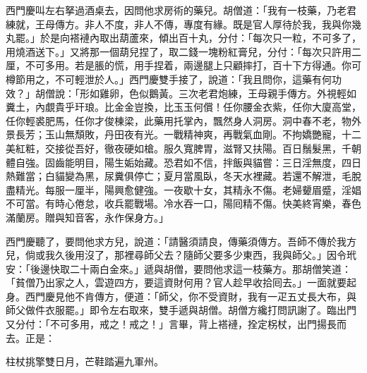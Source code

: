 西門慶叫左右拏過酒桌去，因問他求房術的藥兒。胡僧道：「我有一枝藥，乃老君練就，王母傳方。非人不度，非人不傳，專度有緣。既是官人厚待於我，我與你幾丸罷。」於是向褡褳內取出葫蘆來，傾出百十丸，分付：「每次只一粒，不可多了，用燒酒送下。」又將那一個葫兒捏了，取二錢一塊粉紅膏兒，分付：「每次只許用二厘，不可多用。若是脹的慌，用手捏着，兩邊腿上只顧摔打，百十下方得通。你可樽節用之，不可輕泄於人。」西門慶雙手接了，說道：「我且問你，這藥有何功效？」胡僧說：「形如雞卵，色似鵝黃。三次老君炮練，王母親手傳方。外視輕如糞土，內覷貴乎玕琅。比金金豈換，比玉玉何償！任你腰金衣紫，任你大廈高堂，任你輕裘肥馬，任你才俊棟梁，此藥用托掌內，飄然身人洞房。洞中春不老，物外景長芳；玉山無頹敗，丹田夜有光。一戰精神爽，再戰氣血剛。不拘嬌艷寵，十二美紅粧，交接從吾好，徹夜硬如槍。服久寬脾胃，滋腎又扶陽。百日鬚髮黑，千朝體自強。固齒能明目，陽生姤始藏。恐君如不信，拌飯與貓嘗：三日淫無度，四日熱難當；白貓變為黑，尿糞俱停亡；夏月當風臥，冬天水裡藏。若還不解泄，毛脫盡精光。每服一厘半，陽興愈健強。一夜歇十女，其精永不傷。老婦顰眉蹙，淫娼不可當。有時心倦怠，收兵罷戰場。冷水吞一口，陽囘精不傷。快美終宵樂，春色滿蘭房。贈與知音客，永作保身方。」

西門慶聽了，要問他求方兒，說道：「請醫須請良，傳藥須傳方。吾師不傳於我方兒，倘或我久後用沒了，那裡尋師父去？隨師父要多少東西，我與師父。」因令玳安：「後邊快取二十兩白金來。」遞與胡僧，要問他求這一枝藥方。那胡僧笑道：「貧僧乃出家之人，雲遊四方，要這資財何用？{}官人趁早收拾囘去。」一面就要起身。西門慶見他不肯傳方，便道：「師父，你不受資財，我有一疋五丈長大布，與師父做件衣服罷。」即令左右取來，雙手遞與胡僧。胡僧方纔打問訊謝了。臨出門又分付：「不可多用，戒之！戒之！」言畢，背上褡褳，拴定柺杖，出門揚長而去。正是：

\begin{myquote} 
柱杖挑擎雙日月，芒鞋踏遍九軍州。
\end{myquote} 

